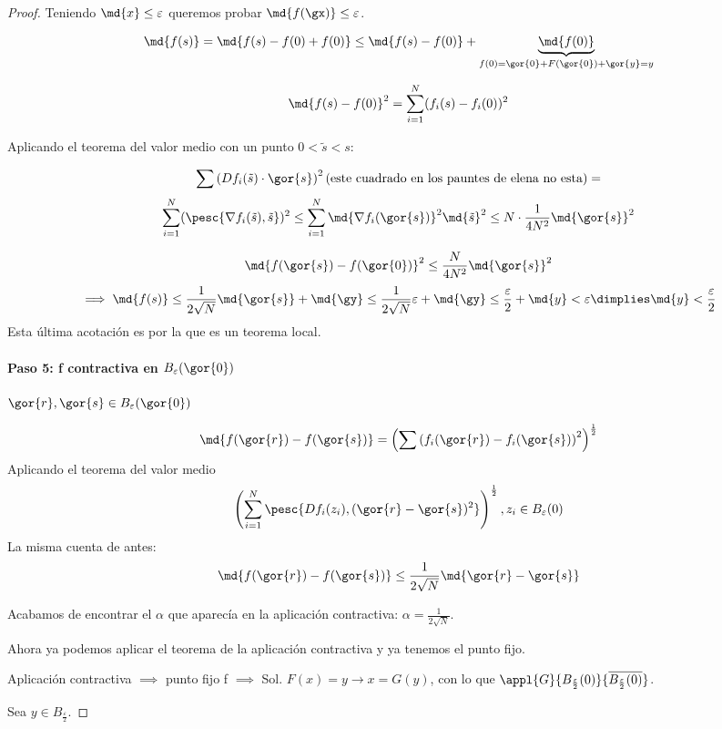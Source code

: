 \documentclass{apuntes}
\begin{document}
\begin{proof}
  Teniendo $\md{x}\leq \varepsilon$ queremos probar $\md{f(\gx)}\leq \varepsilon$.
  
  $$\md{f(s)} = \md{f(s) - f(0) + f(0)} \leq \md{f(s)-f(0)} + \underbrace{\md{f(0)}}_{f(0) = \gor{0} + F(\gor{0}) + \gor{y} = y}$$
  
  $$\md{f(s)-f(0)}^2 = \sum_{i=1}^N (f_i(s)-f_i(0))^2 $$
  
  Aplicando el teorema del valor medio con un punto $0<\tilde{s}<s$:
  
  $$\sum \left(Df_i(\tilde{s})\cdot\gor{s}\right)^2 \text{(este cuadrado en los pauntes de elena no esta)} = $$
  $$\sum_{i=1}^N(\pesc{\nabla f_i(\tilde{s}),\tilde{s}})^2 \leq \sum_{i=1}^N \md{\nabla f_i(\gor{s})}^2\md{\tilde{s}}^2 \leq N \cdot\frac{1}{4N^2} \md{\gor{s}}^2$$
  
  
  $$\md{f(\gor{s}) - f(\gor{0})}^2 \leq \frac{N}{4N^2} \md{\gor{s}}^2$$
  $$\implies \md{f(s)} \leq \frac{1}{2\sqrt{N}} \md{\gor{s}} + \md{\gy} \leq \frac{1}{2\sqrt{N}}\varepsilon + \md{\gy} \leq \frac{\varepsilon}{2} + \md{y} < \varepsilon \dimplies \md{y} < \frac{\varepsilon}{2}$$
  Esta última acotación es por la que es un teorema local.
  
  \paragraph{Paso 5: f contractiva en $B_\varepsilon(\gor{0})$}
  
  $\gor{r},\gor{s} \in B_\varepsilon(\gor{0})$
  
  $$\md{f(\gor{r}) - f(\gor{s})} = \left(\sum \left( f_i(\gor{r}) - f_i(\gor{s})\right) ^2 \right)^{\frac{1}{2}}$$
  Aplicando el teorema del valor medio
  $$\left(\sum_{i=1}^N \pesc{Df_i(z_i), (\gor{r}-\gor{s})^2}\right)^{\frac{1}{2}}, z_i\in B_\varepsilon(0) $$
  La misma cuenta de antes:
  $$\md{f(\gor{r}) - f(\gor{s})} \leq \frac{1}{2\sqrt{N}}\md{\gor{r}-\gor{s}}$$
  
  Acabamos de encontrar el $\alpha$ que aparecía en la aplicación contractiva: $\alpha = \frac{1}{2\sqrt{N}}$. 
  
  Ahora ya podemos aplicar el teorema de la aplicación contractiva y ya tenemos el punto fijo.
  
  Aplicación contractiva $\implies$ punto fijo f $\implies$ Sol. $F(x) = y \rightarrow x = G(y)$, con lo que $\appl{G}{B_{\frac{\varepsilon}{2}}(0)}{\overline{{B_{\frac{\varepsilon}{2}}(0)}}}$.
  
  Sea $y \in B_{\frac{\varepsilon}{2}}$.
  

\end{proof}
\end{document}

